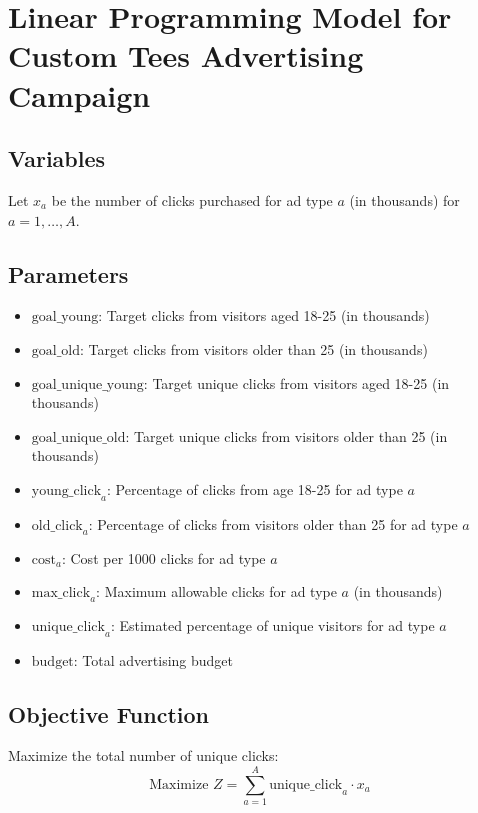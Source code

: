 \documentclass{article}
\begin{document}
\section*{Linear Programming Model for Custom Tees Advertising Campaign}

\subsection*{Variables}
Let \( x_a \) be the number of clicks purchased for ad type \( a \) (in thousands) for \( a = 1, \ldots, A \).

\subsection*{Parameters}
\begin{itemize}
    \item \( \text{goal\_young} \): Target clicks from visitors aged 18-25 (in thousands)
    \item \( \text{goal\_old} \): Target clicks from visitors older than 25 (in thousands)
    \item \( \text{goal\_unique\_young} \): Target unique clicks from visitors aged 18-25 (in thousands)
    \item \( \text{goal\_unique\_old} \): Target unique clicks from visitors older than 25 (in thousands)
    \item \( \text{young\_click}_{a} \): Percentage of clicks from age 18-25 for ad type \( a \)
    \item \( \text{old\_click}_{a} \): Percentage of clicks from visitors older than 25 for ad type \( a \)
    \item \( \text{cost}_{a} \): Cost per 1000 clicks for ad type \( a \)
    \item \( \text{max\_click}_{a} \): Maximum allowable clicks for ad type \( a \) (in thousands)
    \item \( \text{unique\_click}_{a} \): Estimated percentage of unique visitors for ad type \( a \)
    \item \( \text{budget} \): Total advertising budget
\end{itemize}

\subsection*{Objective Function}
Maximize the total number of unique clicks:
\[
\text{Maximize } Z = \sum_{a=1}^{A} \text{unique\_click}_{a} \cdot x_a
\]
\end{document}
